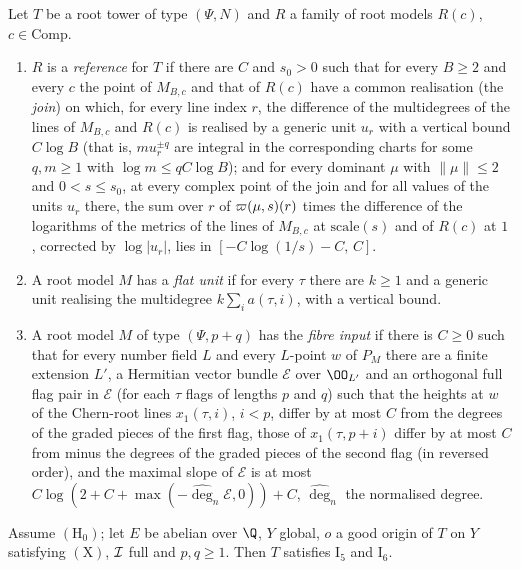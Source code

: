 \begin{definition}\label{pf:volthm:def:reference}
Let $T$ be a root tower of type $(\Psi,N)$ and $R$ a family of root models $R(c)$, $c\in\mathrm{Comp}$.
\begin{enumerate}[label=(\alph*)]
\item $R$ is a \emph{reference} for $T$ if there are $C$ and $s_0>0$ such that for every $B\ge2$ and every $c$ the point
of $M_{B,c}$ and that of $R(c)$ have a common realisation (the \emph{join}) on which, for every line index $r$, the
difference of the multidegrees of the lines of $M_{B,c}$ and $R(c)$ is realised by a generic unit $u_r$ with a vertical
bound $C\log B$ (that is, $m u_r^{\pm q}$ are integral in the corresponding charts for some $q,m\ge1$ with $\log m\le
qC\log B$); and for every dominant $\mu$ with $\|\mu\|\le2$ and $0<s\le s_0$, at every complex point of the join and for
all values of the units $u_r$ there, the sum over $r$ of $\varpi(\mu,s)(r)$ times the difference of the logarithms of
the metrics of the lines of $M_{B,c}$ at $\mathrm{scale}(s)$ and of $R(c)$ at $1$, corrected by $\log|u_r|$, lies in
$[-C\log(1/s)-C,\,C]$.
\item A root model $M$ has a \emph{flat unit} if for every $\tau$ there are $k\ge1$ and a generic unit realising the
multidegree $k\sum_ia(\tau,i)$, with a vertical bound.
\item A root model $M$ of type $(\Psi,p+q)$ has the \emph{fibre input} if there is $C\ge0$ such that for every number field
$L$ and every $L$-point $w$ of $P_M$ there are a finite extension $L'$, a Hermitian vector bundle $\mathcal E$ over
$\OO_{L'}$ and an orthogonal full flag pair in $\mathcal E$ (for each $\tau$ flags of lengths $p$ and $q$) such that the
heights at $w$ of the Chern-root lines $x_1(\tau,i)$, $i<p$, differ by at most $C$ from the degrees of the graded pieces of
the first flag, those of $x_1(\tau,p+i)$ differ by at most $C$ from minus the degrees of the graded pieces of the second
flag (in reversed order), and the maximal slope of $\mathcal E$ is at most $C\log(2+C+\max(-\widehat\deg_n\mathcal E,0))+C$,
$\widehat\deg_n$ the normalised degree.
\end{enumerate}
\end{definition}

\begin{proposition}\label{pf:volthm:prop:I5}
Assume $(\mathrm{H}_0)$; let $E$ be abelian over $\Q$, $Y$ global, $o$ a good origin of $T$ on $Y$ satisfying
$(\mathrm{X})$, $\mathcal{I}$ full and $p,q\ge1$. Then $T$ satisfies $\mathrm{I}_5$ and $\mathrm{I}_6$.
\end{proposition}

